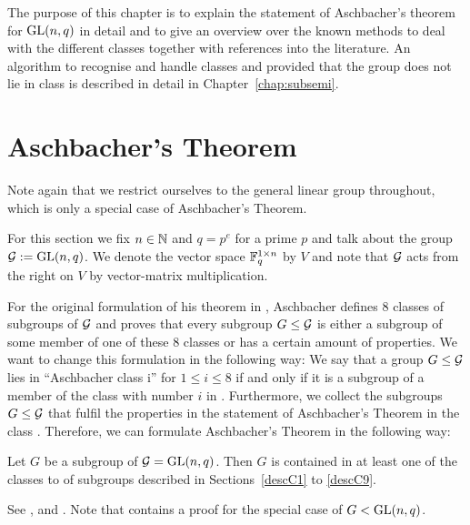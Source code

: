 The purpose of this chapter is to explain the statement of Aschbacher's 
theorem for $\GL(n,q)$ in detail and to give an overview over the known
methods to deal with the different classes together with references into
the literature. An algorithm to recognise and handle classes  and 
provided that the group does not lie in class  is described in detail
in Chapter~\ref{chap:subsemi}.

\section{Aschbacher's Theorem}
\label{sect:aschbacher}

Note again that we restrict ourselves to the general linear group
throughout, which is only a special case of Aschbacher's Theorem.

\begin{Not}
For this section we fix $n \in \mathbb{N}$ and $q=p^e$ for a prime $p$ and
talk about the group $\GG := \GL(n,q)$. We denote the vector space $\mathbb{F}_q^{1
\times n}$ by $V$ and note that $\mathcal{G}$ acts from the right on $V$ by
vector-matrix multiplication.
\end{Not}

For the original formulation of his theorem in \cite{aschbacher}, Aschbacher 
defines $8$ classes
of subgroups of $\mathcal{G}$ and proves that every subgroup $G \le \mathcal{G}$ is either
a subgroup of some member of one of these $8$ classes or has a certain
amount of properties. We want to change this formulation in the following
way: We say that a group $G \le \mathcal{G}$ lies in ``Aschbacher class \CC i''
for $1 \le i \le 8$ if and only if it is a subgroup of a member of
the class with number $i$ in \cite{aschbacher}. Furthermore, we collect
the subgroups $G \le \mathcal{G}$ that fulfil the properties in the statement of 
Aschbacher's Theorem in the class . Therefore, we can formulate
Aschbacher's Theorem in the following way:

\begin{Theo}
\label{Asch}
Let $G$ be a subgroup of\/ $\GG = \GL(n,q)$.
Then $G$ is contained in at least one of the
classes  to  of subgroups described in Sections~\ref{descC1}
to \ref{descC9}.
\end{Theo}
\proofbeg See \cite{aschbacher}, \cite{kleilieb} and
\cite[Theorem~1]{smashprim}. Note that \cite[Section~2]{smashprim}
contains a proof for the special case of $G < \GL(n,q)$.
\proofend

\begin{Rem}
\end{Rem}

